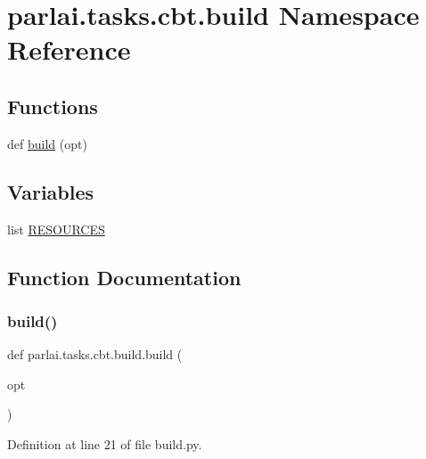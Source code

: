 \hypertarget{namespaceparlai_1_1tasks_1_1cbt_1_1build}{}\section{parlai.\+tasks.\+cbt.\+build Namespace Reference}
\label{namespaceparlai_1_1tasks_1_1cbt_1_1build}
\subsection*{Functions}
\begin{DoxyCompactItemize}
\item 
def \hyperlink{namespaceparlai_1_1tasks_1_1cbt_1_1build_a761a40fc1977992c31cb21a230ba12c5}{build} (opt)
\end{DoxyCompactItemize}
\subsection*{Variables}
\begin{DoxyCompactItemize}
\item 
list \hyperlink{namespaceparlai_1_1tasks_1_1cbt_1_1build_ae08deedf182e874d8653cda0704bff83}{R\+E\+S\+O\+U\+R\+C\+ES}
\end{DoxyCompactItemize}


\subsection{Function Documentation}
\mbox{\label{namespaceparlai_1_1tasks_1_1cbt_1_1build_a761a40fc1977992c31cb21a230ba12c5}} 
\subsubsection{\texorpdfstring{build()}{build()}}
{\footnotesize\ttfamily def parlai.\+tasks.\+cbt.\+build.\+build (\begin{DoxyParamCaption}\item[{}]{opt }\end{DoxyParamCaption})}



Definition at line 21 of file build.\+py.


